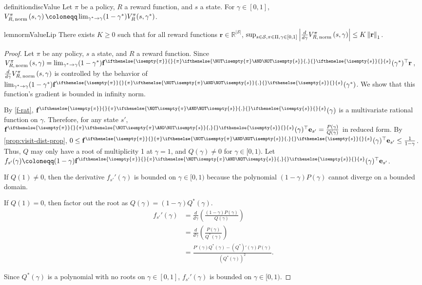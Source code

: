 \documentclass{article}
\renewcommand{\abs}[1]{\left|#1\right|}
\newcommand*{\prn}[1]{\left(#1\right)}
\newcommand*{\defeq}{\coloneqq} %
\newcommand*{\reals}{\mathbb{R}}
\newcommand*{\unitvec}[1][s]{\mathbf{e}_{#1}}
\newcommand*{\St}{\mathcal{S}}
\newcommand*{\rf}{\mathbf{r}} %
\newcommand*{\rewardVS}{\reals^{\abs{\St}}} %
\newcommand*{\f}{\mathbf{f}} %
\newcommand*{\fpi}[2][\pi]{\f^{
\ifthenelse{\isempty{#1}}{}{#1} %
\ifthenelse{\NOT\isempty{#1} \AND \NOT\isempty{#2}}{,}{} %
\ifthenelse{\isempty{#2}}{}{#2}}} %
\newcommand*{\lone}[1]{\left \lVert#1\right \rVert_1}
\theoremstyle{definition}
\begin{document}
\begin{appendices}
\begin{restatable}{definition}{discValue}\label{def:disc-value}
Let $\pi$ be a policy, $R$ a reward function, and $s$ a state. For $\gamma \in [0,1]$, $\VfNorm[\pi]{s,\gamma}\defeq \lim_{\gamma^*\to \gamma}(1-\gamma^*) V^\pi_R(s,\gamma^*)$.
\end{restatable}

\begin{restatable}{lem}{normValueLip}\label{lem:norm-value-lip}
There exists $K\geq0$ such that for all reward functions $\rf\in \rewardVS$, $\sup_{\substack{s\in\St, \pi\in\Pi,\gamma\in [0,1]}}\abs{\frac{d}{d\gamma} \VfNorm[\pi]{s,\gamma}} \leq K\lone{\rf}$.
\end{restatable}
\begin{proof}
Let $\pi$ be any policy, $s$ a state, and $R$ a reward function. Since $\VfNorm[\pi]{s,\gamma}=\lim_{\gamma^*\to\gamma}(1-\gamma^*)\fpi{s}(\gamma^*)^\top \rf$, $\frac{d}{d\gamma}\VfNorm[\pi]{s,\gamma}$ is controlled by the behavior of $\lim_{\gamma^*\to\gamma}(1-\gamma^*)\fpi{s}(\gamma^*)$. We show that this function's gradient is bounded in infinity norm.

By \cref{f-rat}, $\fpi{s}(\gamma)$ is a multivariate rational function on $\gamma$. Therefore, for any state $s'$,  $\fpi{s}(\gamma)^\top\unitvec[s']=\frac{P(\gamma)}{Q(\gamma)}$ in reduced form. By \cref{prop:visit-dist-prop}, $0\leq \fpi{s}(\gamma)^\top\unitvec[s']\leq \frac{1}{1-\gamma}$. Thus, $Q$ may only have a root of multiplicity 1 at $\gamma=1$, and $Q(\gamma)\neq 0$ for $\gamma\in[0,1)$. Let $f_{s'}(\gamma)\defeq (1-\gamma)\fpi{s}(\gamma)^\top\unitvec[s']$.

If $Q(1)\neq 0$, then the derivative $f_{s'}'(\gamma)$ is bounded on $\gamma\in[0,1)$ because the polynomial $(1-\gamma)P(\gamma)$ cannot diverge on a bounded domain. 

If $Q(1)=0$, then factor out the root as $Q(\gamma)=(1-\gamma)Q^*(\gamma)$. 
\begin{align}
    f_{s'}'(\gamma)&=\frac{d}{d\gamma}\prn{\frac{(1-\gamma)P(\gamma)}{Q(\gamma)}}\\
    &=\frac{d}{d\gamma}\prn{\frac{P(\gamma)}{Q^*(\gamma)}}\\
    &=\frac{P'(\gamma)Q^*(\gamma)-(Q^*)'(\gamma)P(\gamma)}{(Q^*(\gamma))^2}.
\end{align}

Since $Q^*(\gamma)$ is a polynomial with no roots on $\gamma\in[0,1]$, $f_{s'}'(\gamma)$ is bounded on $\gamma\in[0,1)$.


\end{proof}
\end{appendices}
\end{document}
